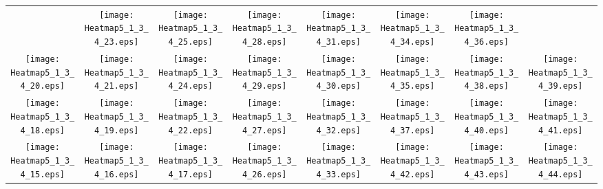 \documentclass{standalone}
\begin{document}
\renewcommand{\arraystretch}{0}
\setlength{\tabcolsep}{0pt}
\begin{tabular}{ *8{c} }
 & \texttt{[image: Heatmap5\_1\_3\_4\_23.eps]} & \texttt{[image: Heatmap5\_1\_3\_4\_25.eps]} & \texttt{[image: Heatmap5\_1\_3\_4\_28.eps]} & \texttt{[image: Heatmap5\_1\_3\_4\_31.eps]} & \texttt{[image: Heatmap5\_1\_3\_4\_34.eps]} & \texttt{[image: Heatmap5\_1\_3\_4\_36.eps]} &  \\
\texttt{[image: Heatmap5\_1\_3\_4\_20.eps]} & \texttt{[image: Heatmap5\_1\_3\_4\_21.eps]} & \texttt{[image: Heatmap5\_1\_3\_4\_24.eps]} & \texttt{[image: Heatmap5\_1\_3\_4\_29.eps]} & \texttt{[image: Heatmap5\_1\_3\_4\_30.eps]} & \texttt{[image: Heatmap5\_1\_3\_4\_35.eps]} & \texttt{[image: Heatmap5\_1\_3\_4\_38.eps]} & \texttt{[image: Heatmap5\_1\_3\_4\_39.eps]} \\
\texttt{[image: Heatmap5\_1\_3\_4\_18.eps]} & \texttt{[image: Heatmap5\_1\_3\_4\_19.eps]} & \texttt{[image: Heatmap5\_1\_3\_4\_22.eps]} & \texttt{[image: Heatmap5\_1\_3\_4\_27.eps]} & \texttt{[image: Heatmap5\_1\_3\_4\_32.eps]} & \texttt{[image: Heatmap5\_1\_3\_4\_37.eps]} & \texttt{[image: Heatmap5\_1\_3\_4\_40.eps]} & \texttt{[image: Heatmap5\_1\_3\_4\_41.eps]} \\
\texttt{[image: Heatmap5\_1\_3\_4\_15.eps]} & \texttt{[image: Heatmap5\_1\_3\_4\_16.eps]} & \texttt{[image: Heatmap5\_1\_3\_4\_17.eps]} & \texttt{[image: Heatmap5\_1\_3\_4\_26.eps]} & \texttt{[image: Heatmap5\_1\_3\_4\_33.eps]} & \texttt{[image: Heatmap5\_1\_3\_4\_42.eps]} & \texttt{[image: Heatmap5\_1\_3\_4\_43.eps]} & \texttt{[image: Heatmap5\_1\_3\_4\_44.eps]} \\

\end{tabular}
\end{document}
